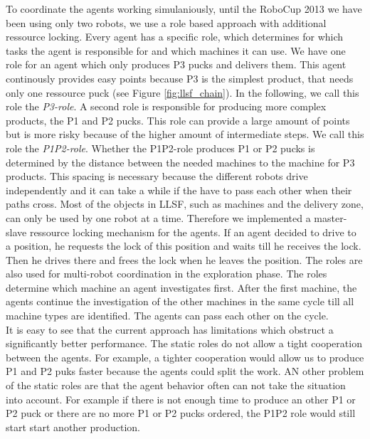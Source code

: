 To coordinate the agents working simulaniously, until the RoboCup 2013 we have been using only two robots, we use a role based approach with additional ressource locking. Every agent has a specific role, which determines for which tasks the agent is responsible for and which machines it can use. We have one role for an agent which only produces P3 pucks and delivers them. This agent continously provides easy points because P3 is the simplest product, that needs only one ressource puck (see Figure \ref{fig:llsf_chain}). In the following, we call this role the \textit{P3-role}. A second role is responsible for producing  more complex products, the P1 and P2 pucks. This role can provide a large amount of points but is more risky because of the higher amount of intermediate steps. We call this role the \textit{P1P2-role}. Whether the P1P2-role produces P1 or P2 pucks is determined by the distance between the needed machines to the machine for P3 products. This spacing is necessary because the different robots drive independently and it can take a while if the have to pass each other when their paths cross. Most of the objects in LLSF, such as machines and the delivery zone, can only be used by one robot at a time. Therefore we implemented a master-slave ressource locking mechanism for the agents. If an agent decided to drive to a position, he requests the lock of this position and waits till he receives the lock. Then he drives there and frees the lock when he leaves the position. The roles are also used for multi-robot coordination in the exploration phase. The roles determine which machine an agent investigates first. After the first machine, the agents continue the investigation of the other machines in the same cycle till all machine types are identified. The agents can pass each other on the cycle.\\
It is easy to see that the current approach has limitations which obstruct a significantly better performance. The static roles do not allow a tight cooperation between the agents. For example, a tighter cooperation would allow us to produce P1 and P2 puks faster because the agents could split the work. AN other problem of the static roles are that the agent behavior often can not take the situation into account. For example if there is not enough time to produce an other P1 or P2 puck or there are no more P1 or P2 pucks ordered, the P1P2 role would still start start another production.\\
